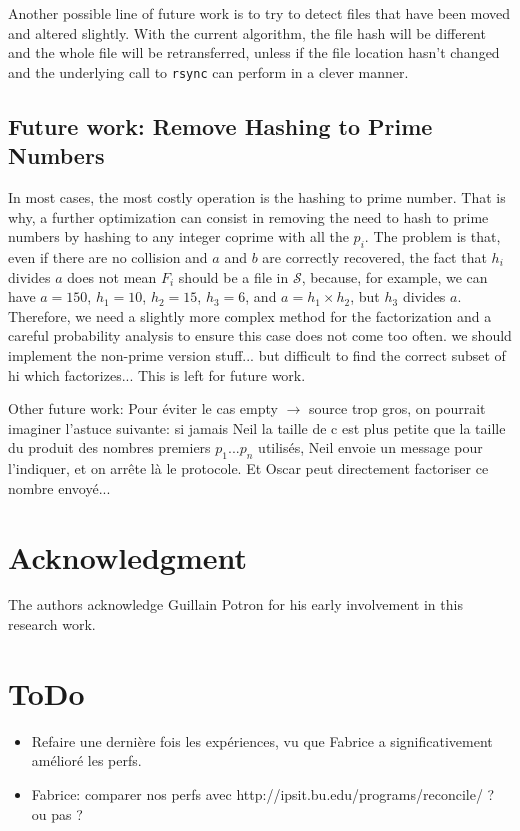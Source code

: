\documentclass[11pt]{llncs}
\newcommand{\rsync}{\texttt{rsync}\xspace}
\begin{document}
Another possible line of future work is to try to detect files that have been
moved and altered slightly. With the current algorithm, the file hash will be
different and the whole file will be retransferred, unless if the file location
hasn't changed and the underlying call to \rsync can perform in a clever manner.

\subsection{Future work: Remove Hashing to Prime Numbers}

In most cases, the most costly operation is the hashing to prime number.
That is why, a further optimization can consist in removing the need to hash to prime numbers by hashing to any integer coprime with all the $p_i$.
The problem is that, even if there are no collision and $a$ and $b$ are correctly recovered, the fact that $h_i$ divides $a$ does not mean $F_i$ should be a file in $\mathcal{S}$, because, for example, we can have $a = 150$, $h_1 = 10$, $h_2 = 15$, $h_3 = 6$, and $a = h_1 \times h_2$, but $h_3$ divides $a$.
Therefore, we need a slightly more complex method for the factorization and a careful probability analysis to ensure this case does not come too often.
we should implement the non-prime version stuff... but difficult to find the correct subset of hi which factorizes...
This is left for future work.

Other future work: Pour éviter le cas empty $\rightarrow$ source trop gros, on pourrait imaginer l'astuce suivante: si jamais Neil la taille de c est plus petite que la taille du produit des nombres premiers $p_1$...$p_n$ utilisés, Neil envoie un message pour l'indiquer, et on arr\^ete là le protocole. Et Oscar peut directement factoriser ce nombre envoyé...

\section{Acknowledgment}

The authors acknowledge Guillain Potron for his early involvement in this research work.\smallskip

\section{ToDo}

\begin{itemize}
\item Refaire une dernière fois les expériences, vu que Fabrice a significativement amélioré les perfs.
\item Fabrice: comparer nos perfs avec http://ipsit.bu.edu/programs/reconcile/ ? ou pas ?
\end{itemize}
\end{document}
